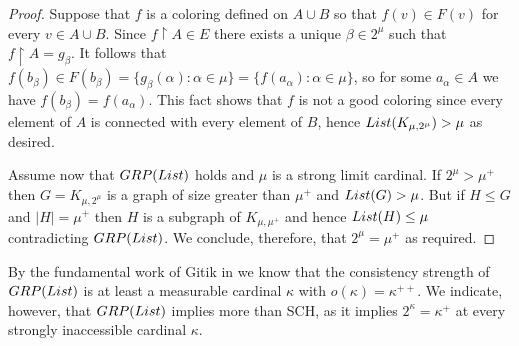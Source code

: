 \documentclass[11pt]{amsart}
\theoremstyle{definition}
\theoremstyle{remark}
\begin{document}
\begin{proof}
Suppose that $f$ is a coloring defined on $A\cup B$ so that $f(v)\in F(v)$ for every $v\in A\cup B$.
Since $f\upharpoonright{A}\in E$ there exists a unique $\beta\in 2^\mu$ such that $f\upharpoonright{A}=g_\beta$.
It follows that $f(b_\beta)\in F(b_\beta)=\{g_\beta(\alpha):\alpha\in\mu\}=\{f(a_\alpha):\alpha\in\mu\}$, so for some $a_\alpha\in A$ we have $f(b_\beta)=f(a_\alpha)$.
This fact shows that $f$ is not a good coloring since every element of $A$ is connected with every element of $B$, hence ${\rm List}(K_{\mu,2^\mu})>\mu$ as desired.

Assume now that ${\rm GRP}({\rm List})$ holds and $\mu$ is a strong limit cardinal.
If $2^\mu>\mu^+$ then $G=K_{\mu,2^\mu}$ is a graph of size greater than $\mu^+$ and ${\rm List}(G)>\mu$.
But if $H\leq G$ and $|H|=\mu^+$ then $H$ is a subgraph of $K_{\mu,\mu^+}$ and hence ${\rm List}(H)\leq\mu$ contradicting ${\rm GRP}({\rm List})$.
We conclude, therefore, that $2^\mu=\mu^+$ as required.
\end{proof}

By the fundamental work of Gitik in \cite{MR1007865} we know that the consistency strength of ${\rm GRP}({\rm List})$ is at least a measurable cardinal $\kappa$ with $o(\kappa)=\kappa^{++}$.
We indicate, however, that ${\rm GRP}({\rm List})$ implies more than \textsf{SCH}, as it implies $2^\kappa=\kappa^+$ at every strongly inaccessible cardinal $\kappa$.

\newpage



\end{document}
